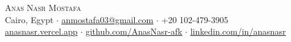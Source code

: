 \begin{center}
  {\Huge \scshape Anas Nasr Mostafa} \\[4pt]
  \footnotesize
  Cairo, Egypt $\cdot$
  \underline{\href{mailto:anmostafa03@gmail.com}{anmostafa03@gmail.com}} $\cdot$
  +20 102-479-3905 \\[2pt]
  \underline{\href{https://anasnasr.vercel.app}{anasnasr.vercel.app}} $\cdot$
  \underline{\href{https://github.com/AnasNasr-afk}{github.com/AnasNasr-afk}} $\cdot$
  \underline{\href{https://linkedin.com/in/anasnasr}{linkedin.com/in/anasnasr}}
\end{center}
\vspace{-11pt}
